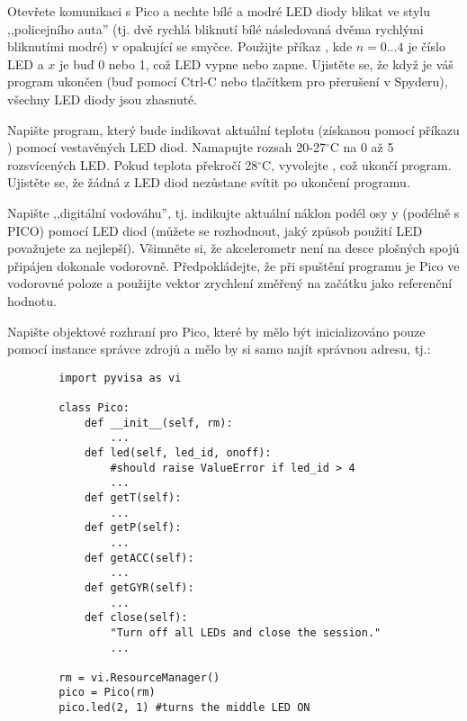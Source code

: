 \begin{exercise}
    Otevřete komunikaci s Pico a nechte bílé a modré LED diody blikat ve stylu ,,policejního auta'' (tj. dvě rychlá bliknutí bílé následovaná dvěma rychlými bliknutími modré) v opakující se smyčce. Použijte příkaz , kde $n=0\dots 4$ je číslo LED a $x$ je buď 0 nebo 1, což LED vypne nebo zapne. Ujistěte se, že když je váš program ukončen (buď pomocí Ctrl-C nebo tlačítkem pro přerušení v Spyderu), všechny LED diody jsou zhasnuté.
\end{exercise}

\begin{exercise}
    Napište program, který bude indikovat aktuální teplotu (získanou pomocí příkazu ) pomocí vestavěných LED diod. Namapujte rozsah 20-27$^\circ$C na 0 až 5 rozsvícených LED. Pokud teplota překročí 28$^\circ$C, vyvolejte , což ukončí program. Ujistěte se, že žádná z LED diod nezůstane svítit po ukončení programu.
\end{exercise}

\begin{exercise}
    Napište ,,digitální vodováhu'', tj. indikujte aktuální náklon podél osy y (podélně s PICO) pomocí LED diod (můžete se rozhodnout, jaký způsob použití LED považujete za nejlepší). Všimněte si, že akcelerometr není na desce plošných spojů připájen dokonale vodorovně. Předpokládejte, že při spuštění programu je Pico ve vodorovné poloze a použijte vektor zrychlení změřený na začátku jako referenční hodnotu.
\end{exercise}

\begin{exercise}
    Napište objektové rozhraní pro Pico, které by mělo být inicializováno pouze pomocí instance správce zdrojů a mělo by si samo najít správnou adresu, tj.:
    \begin{lstlisting}
        import pyvisa as vi

        class Pico:
            def __init__(self, rm):
                ...
            def led(self, led_id, onoff):
                #should raise ValueError if led_id > 4
                ...
            def getT(self):
                ...
            def getP(self):
                ...
            def getACC(self):
                ...
            def getGYR(self):
                ...
            def close(self):
                "Turn off all LEDs and close the session."
                ...
        
        rm = vi.ResourceManager()
        pico = Pico(rm)
        pico.led(2, 1) #turns the middle LED ON
    \end{lstlisting}
\end{exercise}

